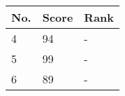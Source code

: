 
\begin{table}[h]
	\begin{tabular}{lll}
		No. & Score & Rank \\\hline
		4 & 94 & - \\
		5 & 99 & - \\
		6 & 89 & -
	\end{tabular}
\end{table}

